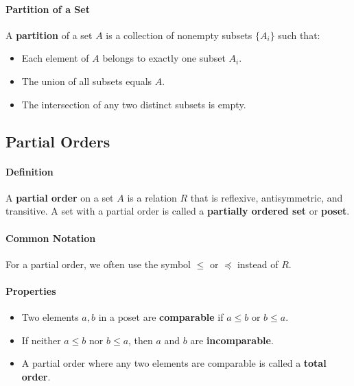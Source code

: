 \paragraph*{Partition of a Set}
A \textbf{partition} of a set $A$ is a collection of nonempty subsets $\{A_i\}$ such that:
\begin{itemize}
    \item Each element of $A$ belongs to exactly one subset $A_i$.
    \item The union of all subsets equals $A$.
    \item The intersection of any two distinct subsets is empty.
\end{itemize}

\subsection{Partial Orders}
\hrulefill

\paragraph*{Definition}
A \textbf{partial order} on a set $A$ is a relation $R$ that is reflexive, antisymmetric, and transitive.
A set with a partial order is called a \textbf{partially ordered set} or \textbf{poset}.

\paragraph*{Common Notation}
For a partial order, we often use the symbol $\leq$ or $\preceq$ instead of $R$.

\paragraph*{Properties}
\begin{itemize}
    \item Two elements $a, b$ in a poset are \textbf{comparable} if $a \leq b$ or $b \leq a$.
    \item If neither $a \leq b$ nor $b \leq a$, then $a$ and $b$ are \textbf{incomparable}.
    \item A partial order where any two elements are comparable is called a \textbf{total order}.
\end{itemize}


